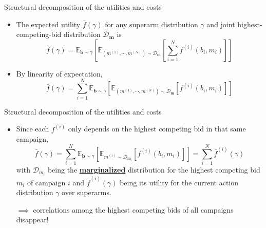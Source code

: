 \begin{frame}{Structural decomposition of the utilities and costs}
    \begin{itemize}
        \item The expected utility $\bar{f}(\gamma)$ for any superarm distribution $\gamma$ and joint highest-competing-bid distribution $\mathcal{D}_\mathbf{m}$ is 
        \[\bar{f}(\gamma) = \mathbb{E}_{\mathbf{b} \sim \gamma}\left[ \mathbb{E}_{(m^{(1)}, \cdots, m^{(N)}) \sim \mathcal{D_\mathbf{m}}}\left[ \sum_{i=1}^N f^{(i)}(b_i, m_i) \right] \right]\]

        \item By linearity of expectation,
        \[\bar{f}(\gamma) = \sum_{i=1}^N \mathbb{E}_{\mathbf{b} \sim \gamma}\left[ \mathbb{E}_{(m^{(1)}, \cdots, m^{(N)}) \sim \mathcal{D_\mathbf{m}}}\left[ f^{(i)}(b_i, m_i) \right] \right]\]
    \end{itemize}
\end{frame}

\begin{frame}{Structural decomposition of the utilities and costs}
    \begin{itemize}
        \item Since each $f^{(i)}$ only depends on the highest competing bid in that same campaign,
        \[\bar{f}(\gamma) = \sum_{i=1}^N \mathbb{E}_{\mathbf{b} \sim \gamma}\left[ \mathbb{E}_{m^{(i)} \sim \mathcal{D}_{\mathbf{m}_i}}\left[ f^{(i)}(b_i, m_i) \right] \right] = \sum_{i=1}^N \bar{f}^{(i)}(\gamma)\]
        with $\mathcal{D}_{m_i}$ being the \underline{\textbf{marginalized}} distribution for the highest competing bid $m_i$ of campaign $i$ and $\bar{f}^{(i)}(\gamma)$ being its utility for the current action distribution $\gamma$ over superarms.

        $\implies$ correlations among the highest competing bids of all campaigns disappear!
    \end{itemize}
\end{frame}

